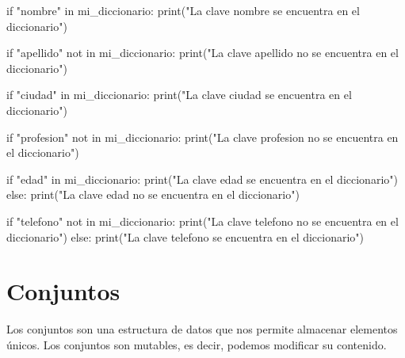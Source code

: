 \documentclass[
  a4paper,
  DIV=11,
  numbers=noendperiod,
  onepage,
  openany]{scrreprt}
\newenvironment{Shaded}{\begin{snugshade}}{\end{snugshade}}
\newcommand{\BuiltInTok}[1]{\textcolor[rgb]{0.00,0.23,0.31}{#1}}
\newcommand{\ControlFlowTok}[1]{\textcolor[rgb]{0.00,0.23,0.31}{#1}}
\newcommand{\KeywordTok}[1]{\textcolor[rgb]{0.00,0.23,0.31}{#1}}
\newcommand{\NormalTok}[1]{\textcolor[rgb]{0.00,0.23,0.31}{#1}}
\newcommand{\StringTok}[1]{\textcolor[rgb]{0.13,0.47,0.30}{#1}}
\begin{document}
\begin{Shaded}
\begin{Highlighting}[]
\ControlFlowTok{if} \StringTok{"nombre"} \KeywordTok{in}\NormalTok{ mi\_diccionario:}
    \BuiltInTok{print}\NormalTok{(}\StringTok{"La clave \textquotesingle{}nombre\textquotesingle{} se encuentra en el diccionario"}\NormalTok{)}

\ControlFlowTok{if} \StringTok{"apellido"} \KeywordTok{not} \KeywordTok{in}\NormalTok{ mi\_diccionario:}
    \BuiltInTok{print}\NormalTok{(}\StringTok{"La clave \textquotesingle{}apellido\textquotesingle{} no se encuentra en el diccionario"}\NormalTok{)}

\ControlFlowTok{if} \StringTok{"ciudad"} \KeywordTok{in}\NormalTok{ mi\_diccionario:}
    \BuiltInTok{print}\NormalTok{(}\StringTok{"La clave \textquotesingle{}ciudad\textquotesingle{} se encuentra en el diccionario"}\NormalTok{)}

\ControlFlowTok{if} \StringTok{"profesion"} \KeywordTok{not} \KeywordTok{in}\NormalTok{ mi\_diccionario:}
    \BuiltInTok{print}\NormalTok{(}\StringTok{"La clave \textquotesingle{}profesion\textquotesingle{} no se encuentra en el diccionario"}\NormalTok{)}

\ControlFlowTok{if} \StringTok{"edad"} \KeywordTok{in}\NormalTok{ mi\_diccionario:}
    \BuiltInTok{print}\NormalTok{(}\StringTok{"La clave \textquotesingle{}edad\textquotesingle{} se encuentra en el diccionario"}\NormalTok{)}
\ControlFlowTok{else}\NormalTok{:}
    \BuiltInTok{print}\NormalTok{(}\StringTok{"La clave \textquotesingle{}edad\textquotesingle{} no se encuentra en el diccionario"}\NormalTok{)}

\ControlFlowTok{if} \StringTok{"telefono"} \KeywordTok{not} \KeywordTok{in}\NormalTok{ mi\_diccionario:}
    \BuiltInTok{print}\NormalTok{(}\StringTok{"La clave \textquotesingle{}telefono\textquotesingle{} no se encuentra en el diccionario"}\NormalTok{)}
\ControlFlowTok{else}\NormalTok{:}
    \BuiltInTok{print}\NormalTok{(}\StringTok{"La clave \textquotesingle{}telefono\textquotesingle{} se encuentra en el diccionario"}\NormalTok{)}
\end{Highlighting}
\end{Shaded}

\chapter{Conjuntos}\label{conjuntos}

Los conjuntos son una estructura de datos que nos permite almacenar
elementos únicos. Los conjuntos son mutables, es decir, podemos
modificar su contenido.
\end{document}

